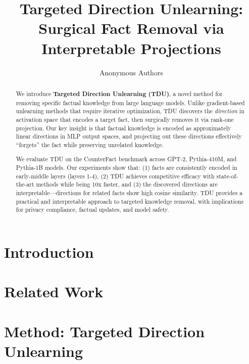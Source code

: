 \documentclass{article}
\title{Targeted Direction Unlearning: \\
Surgical Fact Removal via Interpretable Projections}
\author{
  Anonymous Authors
}
\date{}
\begin{document}
\maketitle

\begin{abstract}
We introduce \textbf{Targeted Direction Unlearning (TDU)}, a novel method for removing specific factual knowledge from large language models. 
Unlike gradient-based unlearning methods that require iterative optimization, TDU discovers the \emph{direction} in activation space that encodes a target fact, then surgically removes it via rank-one projection. 
Our key insight is that factual knowledge is encoded as approximately linear directions in MLP output spaces, and projecting out these directions effectively ``forgets'' the fact while preserving unrelated knowledge.

We evaluate TDU on the CounterFact benchmark across GPT-2, Pythia-410M, and Pythia-1B models. 
Our experiments show that: (1) facts are consistently encoded in early-middle layers (layers 1-4), (2) TDU achieves competitive efficacy with state-of-the-art methods while being 10x faster, and (3) the discovered directions are interpretable---directions for related facts show high cosine similarity.
TDU provides a practical and interpretable approach to targeted knowledge removal, with implications for privacy compliance, factual updates, and model safety.
\end{abstract}

\section{Introduction}


\section{Related Work}


\section{Method: Targeted Direction Unlearning}

\end{document}
